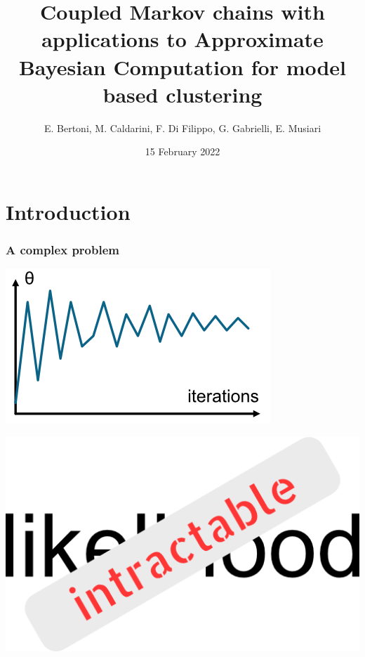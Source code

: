 \documentclass{beamer}
\title{Coupled Markov chains with applications to Approximate Bayesian Computation for model based clustering}
\author{E. Bertoni, M. Caldarini, F. Di Filippo, G. Gabrielli, E. Musiari}
\date{15 February 2022}
\begin{document}
	
	\begin{frame}
		\maketitle
	\end{frame}
	
	\section{Introduction}
		
		\begin{frame}
			\frametitle{A complex problem}
			
			\begin{minipage}{0.45\textwidth}
				\begin{center}
					\includegraphics{img/markov_singola}
				\end{center}
			\end{minipage}
			\hfill
			\begin{minipage}{0.45\textwidth}
				\begin{center}
					\includegraphics{img/likelihood_na}
				\end{center}
			\end{minipage}
			

\end{frame}
\end{document}
